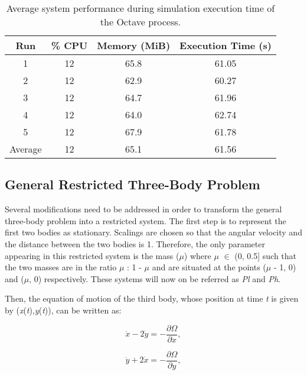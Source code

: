 \documentclass{article}
\begin{document}
\begin{table}[h!]
  \begin{center}
    \caption{Average system performance during simulation execution time of the Octave process.}
    \label{tab:table1}
    \begin{tabular}{c|c|c|c} 
      \textbf{Run} & \textbf{\% CPU} & \textbf{Memory (MiB)} & \textbf{Execution Time (s)}\\
      \hline
      1 & 12 & 65.8 & 61.05\\
      2 & 12 & 62.9 & 60.27\\
      3 & 12 & 64.7 & 61.96\\
      4 & 12 & 64.0 & 62.74\\
      5 & 12 & 67.9 & 61.78\\
      \hline
      Average & 12 & 65.1 & 61.56\\
      \hline
    \end{tabular}
  \end{center}
\end{table}

\subsection{General Restricted Three-Body Problem}

Several modifications need to be addressed in order to transform the general three-body problem into a restricted system. The first step is to represent the first two bodies as stationary. Scalings are chosen so that the angular velocity and the distance between the two bodies is 1. Therefore, the only parameter appearing in this restricted system is the mass ($\mu$) where $\mu$ $\in$ (0, 0.5] such that the two masses are in the ratio $\mu$ : 1 - $\mu$ and are situated at the points ($\mu$ - 1, 0) and ($\mu$, 0) respectively. These systems will now on be referred as \textit{Pl} and \textit{Ph}.

\newpage

Then, the equation of motion of the third body, whose position at time \textit{t} is given by (\textit{x}(\textit{t}),\textit{y}(\textit{t})), can be written as:

\begin{equation}\label{1a}
\ddot{x} - 2\dot{y} = - \frac{\partial \Omega}{\partial x},
\end{equation}

\begin{equation}\label{1b}
\ddot{y} + 2\dot{x} = - \frac{\partial \Omega}{\partial y},
\end{equation}
\end{document}
